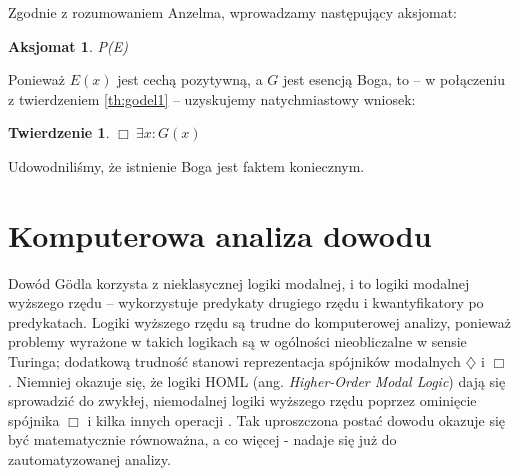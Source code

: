 \documentclass[
	runningheads
]{llncs}
\newtheorem{theorem-pl}{Twierdzenie}
\newtheorem{axiom-pl}{Aksjomat}
\begin{document}
\noindent Zgodnie z rozumowaniem Anzelma, wprowadzamy następujący aksjomat:
\begin{axiom-pl} \label{axiom:godel5}
	P(E)
\end{axiom-pl}
\noindent Ponieważ $E(x)$ jest cechą pozytywną, a $G$ jest esencją Boga, to -- w połączeniu z twierdzeniem \ref{th:godel1} -- uzyskujemy natychmiastowy wniosek:
\begin{theorem-pl} \label{th:godel-god}
	$\Box\ \exists x: G(x)$
\end{theorem-pl}
\noindent Udowodniliśmy, że istnienie Boga jest faktem koniecznym.

\section{Komputerowa analiza dowodu} \label{sec:komputerowa-analiza}
Dowód G\"odla korzysta z nieklasycznej logiki modalnej, i to logiki modalnej wyższego rzędu -- wykorzystuje predykaty drugiego rzędu i kwantyfikatory po predykatach. Logiki wyższego rzędu są trudne do komputerowej analizy, ponieważ problemy wyrażone w takich logikach są w ogólności nieobliczalne w sensie Turinga; dodatkową trudność stanowi reprezentacja spójników modalnych $\diamondsuit$ i $\Box$. Niemniej okazuje się, że logiki HOML (ang. \textit{Higher-Order Modal Logic}) dają się sprowadzić do zwykłej, niemodalnej logiki wyższego rzędu poprzez ominięcie spójnika $\Box$ i kilka innych operacji \cite{benzmuller2014}. Tak uproszczona postać dowodu okazuje się być matematycznie równoważna, a co więcej - nadaje się już do zautomatyzowanej analizy. 
\end{document}
